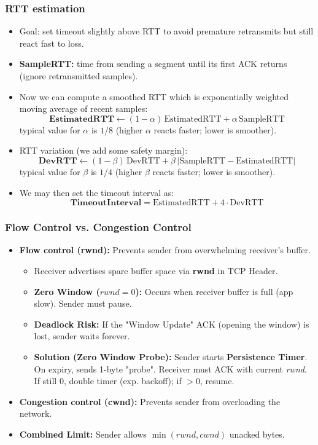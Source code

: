 \subsubsection{RTT estimation}
\begin{itemize}
	\item Goal: set timeout slightly above RTT to avoid premature retransmits but still react fast to loss.
	\item \textbf{SampleRTT:} time from sending a segment until its first ACK returns (ignore retransmitted samples).
	\item Now we can compute a smoothed RTT which is exponentially weighted moving average of recent samples:
	\[ \textbf{EstimatedRTT} \leftarrow (1-\alpha)\,\text{EstimatedRTT} + \alpha\,\text{SampleRTT}\]
	typical value for $\alpha$ is $1/8$ (higher $\alpha$ reacts faster; lower is smoother).
	\item RTT variation (we add some safety margin):
	\[ \textbf{DevRTT} \leftarrow (1-\beta)\,\text{DevRTT} + \beta\,|\text{SampleRTT} - \text{EstimatedRTT}|\]
	typical value for $\beta$ is $1/4$ (higher $\beta$ reacts faster; lower is smoother).
	\item We may then set the timeout interval as:
	\[ 	\textbf{TimeoutInterval} = \text{EstimatedRTT} + 4\cdot \text{DevRTT} \]
\end{itemize}

\subsubsection{Flow Control vs. Congestion Control}
\begin{itemize}
    \item \textbf{Flow control (rwnd):} Prevents sender from overwhelming receiver's buffer.
    \begin{itemize}
        \item Receiver advertises spare buffer space via \textbf{rwnd} in TCP Header.
        \item \textbf{Zero Window ($rwnd=0$):} Occurs when receiver buffer is full (app slow). Sender must pause.
        \item \textbf{Deadlock Risk:} If the "Window Update" ACK (opening the window) is lost, sender waits forever.
        \item \textbf{Solution (Zero Window Probe):} Sender starts \textbf{Persistence Timer}. On expiry, sends 1-byte "probe". Receiver must ACK with current \textit{rwnd}. If still 0, double timer (exp. backoff); if $>0$, resume.
    \end{itemize}
    \item \textbf{Congestion control (cwnd):} Prevents sender from overloading the network.
    \item \textbf{Combined Limit:} Sender allows $\min(rwnd, cwnd)$ unacked bytes.
\end{itemize}

